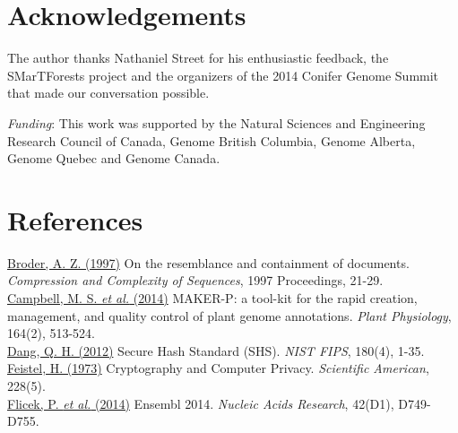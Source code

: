 \documentclass{bioinfo}
\begin{document}
\section*{Acknowledgements}\label{acknowledgements}

The author thanks Nathaniel Street for his enthusiastic feedback, the
SMarTForests project and the organizers of the 2014 Conifer Genome
Summit that made our conversation possible.

\emph{Funding}: This work was supported by the Natural Sciences and
Engineering Research Council of Canada, Genome British Columbia, Genome
Alberta, Genome Quebec and Genome Canada.

\section*{References}\label{references}

\href{http://dx.doi.org/10.1109/SEQUEN.1997.666900}{Broder, A. Z.
(1997)} On the resemblance and containment of documents.
\emph{Compression and Complexity of Sequences}, 1997 Proceedings,
21-29.\\\href{http://dx.doi.org/10.1104/pp.113.230144}{Campbell, M. S.
\emph{et al.} (2014)} MAKER-P: a tool-kit for the rapid creation,
management, and quality control of plant genome annotations. \emph{Plant
Physiology}, 164(2),
513-524.\\\href{http://www.nist.gov/manuscript-publication-search.cfm?pub_id=910977}{Dang,
Q. H. (2012)} Secure Hash Standard (SHS). \emph{NIST FIPS}, 180(4),
1-35.\\\href{http://www.scientificamerican.com/article/cryptography-and-computer-privacy/}{Feistel,
H. (1973)} Cryptography and Computer Privacy. \emph{Scientific
American}, 228(5).\\\href{http://dx.doi.org/10.1093/nar/gkt1196}{Flicek,
P. \emph{et al.} (2014)} Ensembl 2014. \emph{Nucleic Acids Research},
42(D1), D749-D755.
\end{document}
